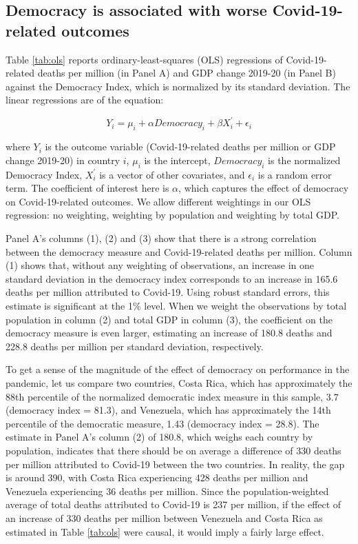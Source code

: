 \subsection{Democracy is associated with worse Covid-19-related outcomes}

Table \ref{tab:ols} reports ordinary-least-squares (OLS) regressions of Covid-19-related deaths per million (in Panel A) and GDP change 2019-20 (in Panel B) against the Democracy Index, which is normalized by its standard deviation. The linear regressions are of the equation: 
    
    \begin{equation}
    \label{eqn:ols}
        Y_i = \mu_i + \alpha Democracy_i + \beta X^{'}_i + \epsilon_i
    \end{equation}
    
\noindent where $Y_i$ is the outcome variable (Covid-19-related deaths per million or GDP change 2019-20) in country $i$, $\mu_i$ is the intercept, $Democracy_i$ is the normalized Democracy Index, $X^{'}_i$ is a vector of other covariates, and $\epsilon_i$ is a random error term. The coefficient of interest here is $\alpha$, which captures the effect of democracy on Covid-19-related outcomes. We allow different weightings in our OLS regression: no weighting, weighting by population and weighting by total GDP. 
    
Panel A's columns (1), (2) and (3) show that there is a strong correlation between the democracy measure and Covid-19-related deaths per million. Column (1) shows that, without any weighting of observations, an increase in one standard deviation in the democracy index corresponds to an increase in 165.6 deaths per million attributed to Covid-19. Using robust standard errors, this estimate is significant at the 1\% level. When we weight the observations by total population in column (2) and total GDP in column (3), the coefficient on the democracy measure is even larger, estimating an increase of 180.8 deaths and 228.8 deaths per million per standard deviation, respectively. 
  
To get a sense of the magnitude of the effect of democracy on performance in the pandemic, let us compare two countries, Costa Rica, which has approximately the 88th percentile of the normalized democratic index measure in this sample, 3.7 (democracy index = 81.3), and Venezuela, which has approximately the 14th percentile of the democratic measure, 1.43 (democracy index = 28.8). The estimate in Panel A's column (2) of 180.8, which weighs each country by population, indicates that there should be on average a difference of 330 deaths per million attributed to Covid-19 between the two countries. In reality, the gap is around 390, with Costa Rica experiencing 428 deaths per million and Venezuela experiencing 36 deaths per million. Since the population-weighted average of total deaths attributed to Covid-19 is 237 per million, if the effect of an increase of 330 deaths per million between Venezuela and Costa Rica as estimated in Table \ref{tab:ols} were causal, it would imply a fairly large effect. 
  
